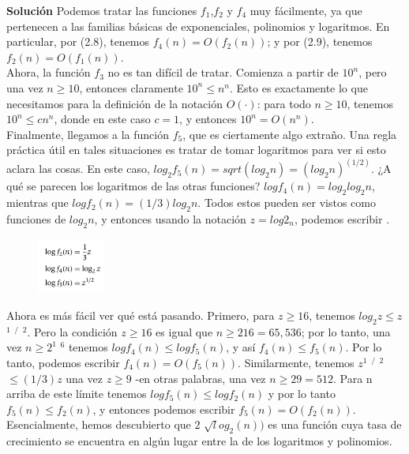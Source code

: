 \documentclass[a4paper, 12pt]{book}
\theoremstyle{dotless}
\begin{document}
\textbf{Solución} Podemos tratar las funciones $f_1$,$ f_2$ y $f_4$ muy fácilmente, ya que pertenecen a las familias básicas de exponenciales, polinomios y logaritmos. En particular, por (2.8), tenemos $f_4 (n) = O (f_2 (n))$; y por (2.9), tenemos $f_2 (n) = O (f_1 (n))$.\\

Ahora, la función $f_3$ no es tan difícil de tratar. Comienza a partir de $10 ^ n$, pero una vez $n ≥ 10$, entonces claramente $10 ^ n ≤ n ^ n$. Esto es exactamente lo que necesitamos para la definición de la notación $O (·)$: para todo $n ≥ 10$, tenemos $10 ^ n ≤ cn ^ n$, donde en este caso $c = 1$, y entonces $10 ^ n = O (n ^ n)$.\\

Finalmente, llegamos a la función $f_5$, que es ciertamente algo extraño. Una regla práctica útil en tales situaciones es tratar de tomar logaritmos para ver si esto aclara las cosas. En este caso, $log_2 f_5 (n) = sqrt (log_2 n) = (log_2 n) ^ (1/2)$. ¿A qué se parecen los logaritmos de las otras funciones? $log f_4 (n) = log_2 log_2 n$, mientras que $log f_2 (n) = (1/3) log_2 n$. Todos estos pueden ser vistos como funciones de $log_2 n$, y entonces usando la notación $z = log2_n$, podemos escribir .

\begin{figure}[h] 
  \centering
    \includegraphics[width=0.2\textwidth]{Imagenes-Seccion2/form2_2.PNG}
\end{figure}

Ahora es más fácil ver qué está pasando. Primero, para $z ≥ 16$, tenemos $log_2 z ≤  z$  $^1$ $^/$ $^2$. Pero la condición $z ≥ 16$ es igual que $n ≥ 216 = 65, 536$; por lo tanto, una vez $n ≥ 2 ^1$ $^6$ tenemos $log f_4 (n) ≤ log f_5 (n)$, y así $f_4 (n) ≤ f_5 (n)$. Por lo tanto, podemos escribir $f_4 (n) = O (f_5 (n))$. Similarmente, tenemos $z^1$ $^/$ $^ 2$ $≤ (1/3)z$ una vez $z ≥ 9$ -en otras palabras, una vez $n ≥ 29 = 512$. Para n arriba de este límite tenemos $log f_5 (n) ≤ log f_2 (n)$ y por lo tanto $f_5 (n) ≤ f_2 (n)$, y entonces podemos escribir $f_5 (n) = O (f_2 (n))$. Esencialmente, hemos descubierto que $2$ $\sqrt log_2 (n))$ es una función cuya tasa de crecimiento se encuentra en algún lugar entre la de los logaritmos y polinomios.\\
\end{document}
